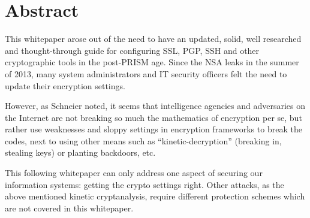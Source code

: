 \section{Abstract}

This whitepaper arose out of the need to have an updated, solid, well researched and thought-through guide for configuring SSL, PGP, SSH and other cryptographic tools in the post-PRISM age.
Since the NSA leaks in the summer of 2013, many system administrators and IT security officers felt the need to update their encryption settings.

However, as Schneier\cite{SchneiderNSAbreaksEncryption} noted, it seems that intelligence agencies and adversaries on the Internet are not breaking so much the mathematics of encryption per se, but rather use weaknesses and sloppy settings in encryption frameworks to break the codes, next to using other means such as ``kinetic-decryption'' (breaking in, stealing keys) or planting backdoors, etc.


This following whitepaper can only address one aspect of securing our information systems: getting the crypto settings right. Other attacks, as the above mentioned kinetic cryptanalysis, require different protection schemes which are not covered in this whitepaper. 

